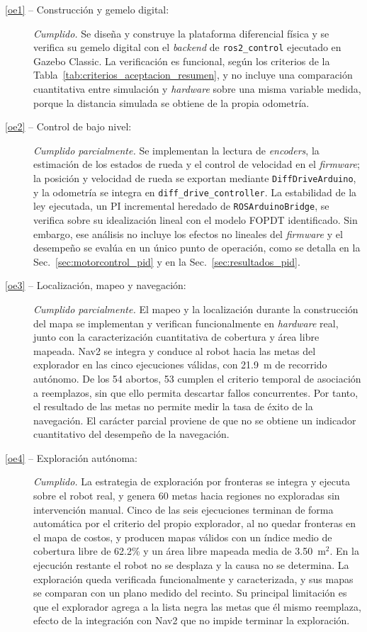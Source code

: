 \begin{description}
\item[\autoref{oe1} -- Construcción y gemelo digital:] \textit{Cumplido.} Se diseña y construye la plataforma diferencial física y se verifica su gemelo digital con el \textit{backend} de \texttt{ros2\_control} ejecutado en Gazebo Classic. La verificación es funcional, según los criterios de la Tabla~\ref{tab:criterios_aceptacion_resumen}, y no incluye una comparación cuantitativa entre simulación y \textit{hardware} sobre una misma variable medida, porque la distancia simulada se obtiene de la propia odometría.

\item[\autoref{oe2} -- Control de bajo nivel:]
\textit{Cumplido parcialmente.} Se implementan la lectura de \textit{encoders},
la estimación de los estados de rueda y el control de velocidad en el \textit{firmware};
la posición y velocidad de rueda se exportan mediante
\texttt{DiffDriveArduino}, y la odometría se integra en
\texttt{diff\_drive\_controller}. La estabilidad de la ley ejecutada, un PI
incremental heredado de \texttt{ROSArduinoBridge}, se verifica sobre su
idealización lineal con el modelo FOPDT identificado. Sin embargo, ese
análisis no incluye los efectos no lineales del \textit{firmware} y el
desempeño se evalúa en un único punto de operación, como se detalla
en la Sec.~\ref{sec:motorcontrol_pid} y en la Sec.~\ref{sec:resultados_pid}.

\item[\autoref{oe3} -- Localización, mapeo y navegación:]
\textit{Cumplido parcialmente.} El mapeo y la localización durante la
construcción del mapa se implementan y verifican funcionalmente en \textit{hardware}
real, junto con la caracterización cuantitativa de cobertura y área libre
mapeada. Nav2 se integra y conduce al robot hacia las metas del explorador en
las cinco ejecuciones válidas, con 21.9~m de recorrido autónomo. De los
54 abortos, 53 cumplen el criterio temporal de asociación a reemplazos,
sin que ello permita descartar fallos concurrentes. Por tanto, el
resultado de las metas no permite medir la tasa de éxito de la navegación. El
carácter parcial proviene de que no se obtiene un indicador cuantitativo del
desempeño de la navegación.

\item[\autoref{oe4} -- Exploración autónoma:] \textit{Cumplido.} La estrategia
de exploración por fronteras se integra y ejecuta sobre el robot real, y genera
60 metas hacia regiones no exploradas sin intervención manual. Cinco de las seis
ejecuciones terminan de forma automática por el criterio del propio
explorador, al no quedar fronteras en el mapa de costos, y producen mapas
válidos con un índice medio de cobertura libre de 62.2\% y un área libre mapeada
media de 3.50~m$^2$. En la ejecución restante el robot no se desplaza y la causa
no se determina. La exploración queda verificada funcionalmente y caracterizada,
y sus mapas se comparan con un plano medido del recinto. Su principal
limitación es que el explorador agrega a la lista negra las metas que él mismo
reemplaza, efecto de la integración con Nav2 que no impide terminar la
exploración.
\end{description}

